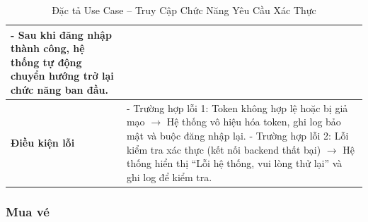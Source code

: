 \begin{table}[H]
\begin{tabularx}{\textwidth}{|l|X|}
\hspace*{1em}- Sau khi đăng nhập thành công, hệ thống tự động chuyển hướng trở lại chức năng ban đầu. \\ \hline
\textbf{Điều kiện lỗi} &
- Trường hợp lỗi 1: Token không hợp lệ hoặc bị giả mạo $\rightarrow$ Hệ thống vô hiệu hóa token, ghi log bảo mật và buộc đăng nhập lại. \newline
- Trường hợp lỗi 2: Lỗi kiểm tra xác thực (kết nối backend thất bại) $\rightarrow$ Hệ thống hiển thị “Lỗi hệ thống, vui lòng thử lại” và ghi log để kiểm tra. \\ \hline
\end{tabularx}
\vspace{15pt}
\caption{Đặc tả Use Case -- Truy Cập Chức Năng Yêu Cầu Xác Thực}
\label{tab:uc_auth_access}
\end{table}

\subsubsection{Mua vé}

